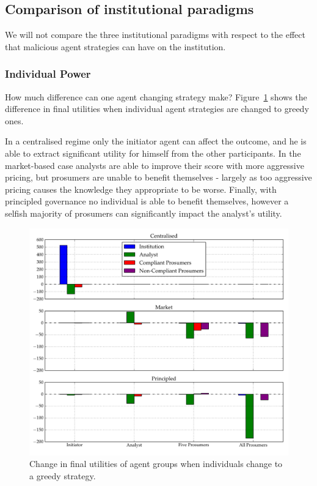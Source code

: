 \subsection{Comparison of institutional paradigms}

We will not compare the three institutional paradigms with respect to the effect that malicious agent strategies can have on the institution.

\subsubsection{Individual Power}

How much difference can one agent changing strategy make? Figure~\ref{fig:powerbar} shows the difference in final utilities when individual agent strategies are changed to greedy ones. 

In a centralised regime only the initiator agent can affect the outcome, and he is able to extract significant utility for himself from the other participants. In the market-based case analysts are able to improve their score with more aggressive pricing, but prosumers are unable to benefit themselves - largely as too aggressive pricing causes the knowledge they appropriate to be worse. Finally, with principled governance no individual is able to benefit themselves, however a selfish majority of prosumers can significantly impact the analyst's utility.

\begin{figure}
\includegraphics[width=\linewidth]{gfx/kc/powerbarv2.pdf} 
\caption{Change in final utilities of agent groups when individuals change to a greedy strategy.}\label{fig:powerbar}
\end{figure}

